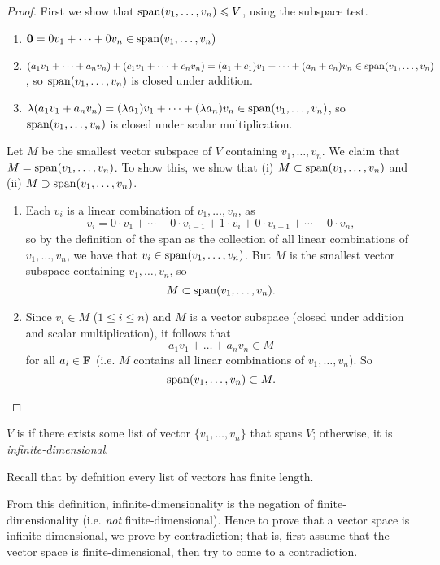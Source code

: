 \begin{proof}
First we show that $\operatorname{span}(v_1,\dots,v_n)\leqslant V$, using the subspace test.
\begin{enumerate}[label=(\roman*)]
\item $\vb{0}=0v_1+\cdots+0v_n\in\operatorname{span}(v_1,\dots,v_n)$
\item $(a_1v_1+\cdots+a_nv_n)+(c_1v_1+\cdots+c_nv_n)=(a_1+c_1)v_1+\cdots+(a_n+c_n)v_n\in\operatorname{span}(v_1,\dots,v_n)$, so $\operatorname{span}(v_1,\dots,v_n)$ is closed under addition.
\item $\lambda(a_1v_1+a_nv_n)=(\lambda a_1)v_1+\cdots+(\lambda a_n)v_n\in\operatorname{span}(v_1,\dots,v_n)$, so $\operatorname{span}(v_1,\dots,v_n)$ is closed under scalar multiplication.
\end{enumerate}

Let $M$ be the smallest vector subspace of $V$ containing $v_1,\dots,v_n$. We claim that $M=\operatorname{span}(v_1,\dots,v_n)$. To show this, we show that (i) $M\subset\operatorname{span}(v_1,\dots,v_n)$ and (ii) $M\supset\operatorname{span}(v_1,\dots,v_n)$.
\begin{enumerate}[label=(\roman*)]
\item Each $v_i$ is a linear combination of $v_1,\dots,v_n$, as
\[v_i=0\cdot v_1+\cdots+0\cdot v_{i-1}+1\cdot v_i+0\cdot v_{i+1}+\cdots+0\cdot v_n,\]
so by the definition of the span as the collection of all linear combinations of $v_1,\dots,v_n$, we have that $v_i\in\operatorname{span}(v_1,\dots,v_n)$. But $M$ is the smallest vector subspace containing $v_1,\dots,v_n$, so
\[M\subset\operatorname{span}(v_1,\dots,v_n).\]
\item Since $v_i\in M$ ($1\le i\le n$) and $M$ is a vector subspace (closed under addition and scalar multiplication), it follows that
\[a_1v_1+\dots+a_nv_n\in M\]
for all $a_i\in\mathbf F$ (i.e. $M$ contains all linear combinations of $v_1,\dots,v_n$). So
\[\operatorname{span}(v_1,\dots,v_n)\subset M.\]
\end{enumerate}
\end{proof}

\begin{definition}
$V$ is  if there exists some list of vector $\{v_1,\dots,v_n\}$ that spans $V$; otherwise, it is \emph{infinite-dimensional}.
\end{definition}

\begin{remark}
Recall that by defnition every list of vectors has finite length.
\end{remark}

\begin{remark}
From this definition, infinite-dimensionality is the negation of finite-dimensionality (i.e. \emph{not} finite-dimensional). Hence to prove that a vector space is infinite-dimensional, we prove by contradiction; that is, first assume that the vector space is finite-dimensional, then try to come to a contradiction.
\end{remark}

